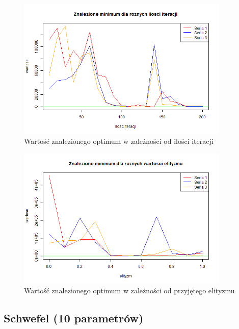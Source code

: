 \documentclass[11pt, a4paper]{article}
\begin{document}
\begin{figure}[H]
	\begin{center}
		\includegraphics[width=0.9\textwidth]{./assets/PriceTransistor5.png} %
		\caption{Wartość znalezionego optimum w zależności od ilości iteracji}
		\label{fig:pricetransistor5}
	\end{center}
\end{figure}

\begin{figure}[H]
	\begin{center}
		\includegraphics[width=0.9\textwidth]{./assets/PriceTransistor6.png} %
		\caption{Wartość znalezionego optimum w zależności od przyjętego elityzmu}
		\label{fig:pricetransistor6}
	\end{center}
\end{figure}

\newpage
\subsection{Schwefel (10 parametrów)}
\end{document}
